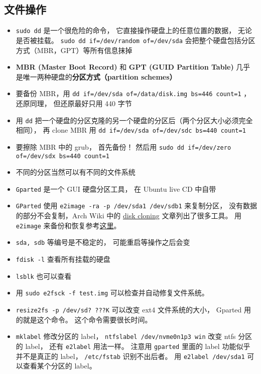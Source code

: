 
\begin{issues}
\issueDraft
\end{issues}

\subsection{文件操作}
\begin{itemize}
\item \verb|sudo dd| 是一个很危险的命令， 它直接操作硬盘上的任意位置的数据， 无论是否被挂载。 \verb|sudo dd if=/dev/random of=/dev/sda| 会把整个硬盘包括分区方式（MBR，GPT）等所有信息抹掉
\item \textbf{MBR (Master Boot Record)} 和 \textbf{GPT (GUID Partition Table)} 几乎是唯一两种硬盘的\textbf{分区方式（partition schemes）}
\item 要备份 MBR，用 \verb|dd if=/dev/sda of=/data/disk.img bs=446 count=1| ， 还原同理， 但还原最好只用 440 字节
\item 用 \verb|dd| 把一个硬盘的分区克隆的另一个硬盘的分区后（两个分区大小必须完全相同）， 再 clone MBR 用 \verb|dd if=/dev/sda of=/dev/sdc bs=440 count=1|
\item 要擦除 MBR 中的 grub， 首先备份！ 然后用 \verb|sudo dd if=/dev/zero of=/dev/sdx bs=440 count=1|
\item 不同的分区当然可以有不同的文件系统
\item \verb|Gparted| 是一个 GUI 硬盘分区工具， 在 Ubuntu live CD 中自带
\item \verb|GParted| 使用 \verb|e2image -ra -p /dev/sda1 /dev/sdb1| 来复制分区， 没有数据的部分不会复制，Arch Wiki 中的 \href{https://wiki.archlinux.org/title/disk_cloning}{disk cloning} 文章列出了很多工具。 用 \verb|e2image| 来备份和恢复参考\href{https://stackoverflow.com/questions/51755887/backup-and-restore-e2image-how-do-i-properly-pipe-the-output-from-lzop}{这里}。
\item \verb|sda, sdb| 等编号是不稳定的， 可能重启等操作之后会变
\item \verb|fdisk -l| 查看所有挂载的硬盘
\item \verb|lsblk| 也可以查看
\item 用 \verb|sudo e2fsck -f test.img| 可以检查并自动修复文件系统。
\item \verb|resize2fs -p /dev/sd? ???K| 可以改变 ext4 文件系统的大小， Gparted 用的就是这个命令。 这个命令需要很长时间。
\item \verb|mklabel| 修改分区的 label， \verb|ntfslabel /dev/nvme0n1p3 win| 改变 ntfs 分区的 label， 还有 \verb|e2label| 用法一样。 注意用 \verb|gparted| 里面的 label 功能似乎并不是真正的 label， \verb|/etc/fstab| 识别不出后者。 用 \verb|e2label /dev/sda1| 可以查看某个分区的 label。

\end{itemize}

